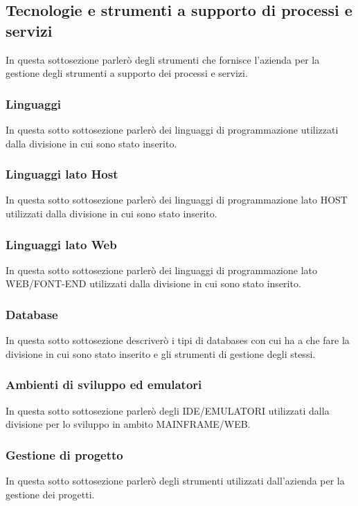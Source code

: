 \subsection{Tecnologie e strumenti a supporto di processi e servizi}
In questa sottosezione parlerò degli strumenti che fornisce l'azienda per la gestione degli strumenti a supporto dei processi e servizi.

\subsubsection{Linguaggi}
In questa sotto sottosezione parlerò dei linguaggi di programmazione utilizzati dalla divisione in cui sono stato inserito.

\subsubsection{Linguaggi lato Host}
In questa sotto sottosezione parlerò dei linguaggi di programmazione lato HOST utilizzati dalla divisione in cui sono stato inserito.

\subsubsection{Linguaggi lato Web}
In questa sotto sottosezione parlerò dei linguaggi di programmazione lato WEB/FONT-END utilizzati dalla divisione in cui sono stato inserito.

\subsubsection{Database}
In questa sotto sottosezione descriverò i tipi di databases con cui ha a che fare la divisione in cui sono stato inserito e gli strumenti di gestione degli stessi.

\subsubsection{Ambienti di sviluppo ed emulatori}
In questa sotto sottosezione parlerò degli IDE/EMULATORI utilizzati dalla divisione per lo sviluppo in ambito MAINFRAME/WEB.

\subsubsection{Gestione di progetto}
In questa sotto sottosezione parlerò degli strumenti utilizzati dall'azienda per la gestione dei progetti.

